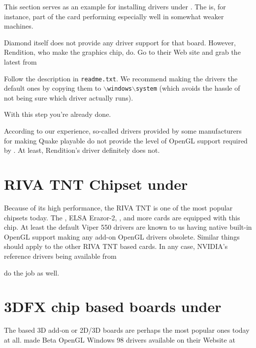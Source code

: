 This section serves as an example for installing 
drivers under . The  is, for instance, part of the 
card performing especially well in somewhat weaker machines.

Diamond itself does not provide any  driver support for that board.
However, Rendition, who make the graphics chip, do. Go to their Web site and grab the
latest   from


 \noindent
Follow the description in \texttt{readme.txt}. We recommend making
the drivers the default ones by copying them to
\texttt{$\backslash$windows$\backslash$system} (which avoids the
hassle of not being sure which driver actually runs).

With this step you're already done.

According to our experience, so-called  drivers
provided by some manufacturers for making Quake playable do not
provide the level of OpenGL support required by {\FlightGear}. At
least, Rendition's  driver definitely does not.

\section{RIVA TNT Chipset under
 \label{rivatnt}}

Because of its high performance, the RIVA TNT is one of the most popular chipsets today.
The ,  ELSA Erazor-2, , and
more cards are equipped with this chip. At least the default Viper 550 drivers are known
to us having native built-in OpenGL support making any add-on OpenGL drivers obsolete.
Similar things should apply to the other RIVA TNT based cards. In any case, NVIDIA's
reference drivers being available from


\noindent
 do the job as well.

\section{3DFX chip based boards under
 \label{3DFXwin98}}

The  based 3D add-on or 2D/3D boards are perhaps the
most popular ones today at all.  made Beta OpenGL
Windows 98 drivers available on their Website at

